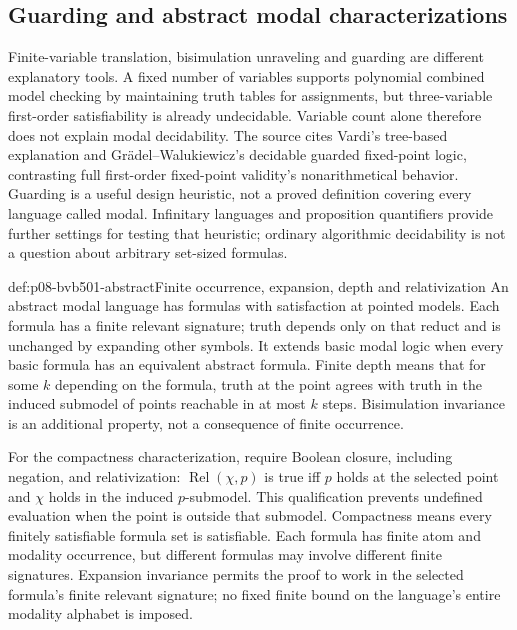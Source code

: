 \subsection{Guarding and abstract modal characterizations}
\label{sec:p08-bvb501-abstract}

Finite-variable translation, bisimulation unraveling and guarding are
different explanatory tools. A fixed number of variables supports
polynomial combined model checking by maintaining truth tables for
assignments, but three-variable first-order satisfiability is already
undecidable. Variable count alone therefore does not explain modal
decidability. The source cites Vardi's tree-based explanation and
Gr\"adel--Walukiewicz's decidable guarded fixed-point logic, contrasting
full first-order fixed-point validity's nonarithmetical behavior. Guarding
is a useful design heuristic, not a proved definition covering every
language called modal. Infinitary languages and proposition quantifiers
provide further settings for testing that heuristic; ordinary algorithmic
decidability is not a question about arbitrary set-sized formulas.

\begin{hbdefinition}{def:p08-bvb501-abstract}{Finite occurrence, expansion, depth and relativization}
An abstract modal language has formulas with satisfaction at pointed
models. Each formula has a finite relevant signature; truth depends only
on that reduct and is unchanged by expanding other symbols. It extends
basic modal logic when every basic formula has an equivalent abstract
formula. Finite depth means that for some \(k\) depending on the
formula, truth at the point agrees with truth in the induced submodel
of points reachable in at most \(k\) steps. Bisimulation invariance
is an additional property, not a consequence of finite occurrence.

For the compactness characterization, require Boolean closure, including
negation, and relativization: \(\operatorname{Rel}(\chi,p)\)
is true iff \(p\) holds at the selected point and \(\chi\)
holds in the induced \(p\)-submodel. This qualification prevents
undefined evaluation when the point is outside that submodel. Compactness
means every finitely satisfiable formula set is satisfiable. Each formula
has finite atom and modality occurrence, but different formulas may
involve different finite signatures. Expansion invariance permits the
proof to work in the selected formula's finite relevant signature;
no fixed finite bound on the language's entire modality alphabet is imposed.
\end{hbdefinition}

